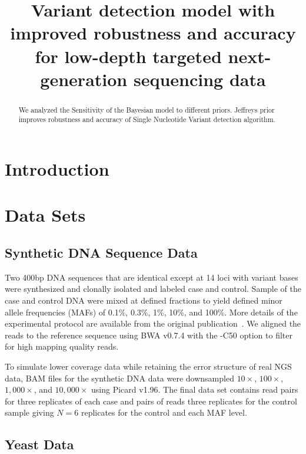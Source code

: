 \documentclass[11pt,reqno]{amsart}
\title[RVD3]{Variant detection model with improved robustness and accuracy for low-depth targeted next-generation sequencing data}
\author{}
\begin{document}
\begin{abstract}

We analyzed the Sensitivity of the Bayesian model to different priors. Jeffreys prior improves robustness and accuracy of Single Nucleotide Variant detection algorithm.

\end{abstract}

\maketitle

\section{Introduction}





\section{Data Sets}

\subsection{Synthetic DNA Sequence Data}

Two 400bp DNA sequences that are identical except at 14 loci with variant bases were synthesized and clonally isolated and labeled case and control. Sample of the case and control DNA were mixed at defined fractions to yield defined minor allele frequencies (MAFs) of 0.1\%, 0.3\%, 1\%, 10\%, and 100\%. More details of the experimental protocol are available from the original publication~\citep{Flaherty:2011ja}. We aligned the reads to the reference sequence using BWA v0.7.4 with the -C50 option to filter for high mapping quality reads.

To simulate lower coverage data while retaining the error structure of real NGS data, BAM files for the synthetic DNA data were downsampled $10\times$, $100\times$, $1,000\times$, and $10,000\times$ using Picard v1.96. The final data set contains read pairs for three replicates of each case and pairs of reads three replicates for the control sample giving $N=6$ replicates for the control and each MAF level.

\subsection{Yeast Data}
\end{document}
